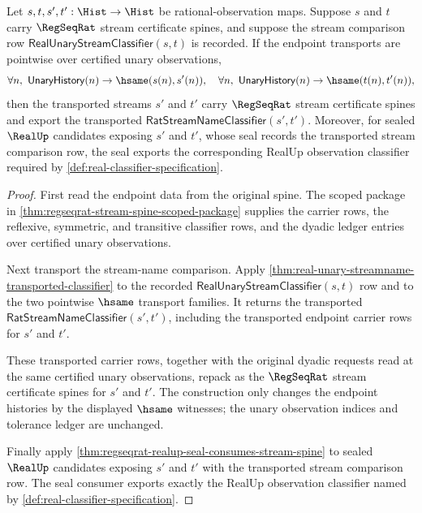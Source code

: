 \begin{theorem}
\label{thm:regseqrat-spine-pointwise-hsame-transport}
Let $s,t,s',t':\Hist\to\Hist$ be rational-observation maps. Suppose $s$ and
$t$ carry $\RegSeqRat$ stream certificate spines, and suppose the stream
comparison row $\mathsf{RealUnaryStreamClassifier}(s,t)$ is recorded. If the
endpoint transports are pointwise over certified unary observations,
$$
\forall n,\ \mathsf{UnaryHistory}(n)\to\hsame(s(n),s'(n)),
\quad
\forall n,\ \mathsf{UnaryHistory}(n)\to\hsame(t(n),t'(n)),
$$
then the transported streams $s'$ and $t'$ carry $\RegSeqRat$ stream
certificate spines and export the transported
$\mathsf{RatStreamNameClassifier}(s',t')$. Moreover, for sealed $\RealUp$
candidates exposing $s'$ and $t'$, whose seal records the transported stream
comparison row, the seal exports the corresponding RealUp observation
classifier required by \autoref{def:real-classifier-specification}.
\end{theorem}
\begin{proof}
First read the endpoint data from the original spine. The scoped package in
\autoref{thm:regseqrat-stream-spine-scoped-package} supplies the carrier rows,
the reflexive, symmetric, and transitive classifier rows, and the dyadic ledger
entries over certified unary observations.

Next transport the stream-name comparison. Apply
\autoref{thm:real-unary-streamname-transported-classifier} to the recorded
$\mathsf{RealUnaryStreamClassifier}(s,t)$ row and to the two pointwise
$\hsame$ transport families. It returns the transported
$\mathsf{RatStreamNameClassifier}(s',t')$, including the transported endpoint
carrier rows for $s'$ and $t'$.

These transported carrier rows, together with the original dyadic requests read
at the same certified unary observations, repack as the $\RegSeqRat$ stream
certificate spines for $s'$ and $t'$. The construction only changes the
endpoint histories by the displayed $\hsame$ witnesses; the unary observation
indices and tolerance ledger are unchanged.

Finally apply
\autoref{thm:regseqrat-realup-seal-consumes-stream-spine} to sealed $\RealUp$
candidates exposing $s'$ and $t'$ with the transported stream comparison row.
The seal consumer exports exactly the RealUp observation classifier named by
\autoref{def:real-classifier-specification}.
\end{proof}

